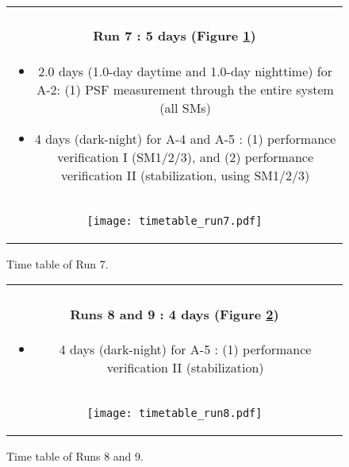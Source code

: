 \begin{figure}[!ht]
\begin{center}
\begin{tabular}{c}
\begin{minipage}{0.95\hsize}
\paragraph{Run 7 : 5 days  (Figure \ref{fig:run7})}
	\begin{itemize}
	\item 2.0 days (1.0-day daytime and 1.0-day nighttime) for A-2: 
	(1) PSF measurement through the entire system (all SMs)
	\item 4 days (dark-night) for A-4 and A-5 : 
	(1) performance verification I (SM1/2/3),  and
	(2) performance verification II (stabilization, using SM1/2/3)
	\end{itemize}
\end{minipage} \\
\begin{minipage}{0.8\hsize}
	\begin{center}
	\vspace*{5mm}
	\texttt{[image: timetable\_run7.pdf]}
	\end{center}
	\vspace*{-5mm}
	\caption{Time table of Run 7.}
	\label{fig:run7}
\end{minipage}
\end{tabular}
\end{center}
\end{figure}

\begin{figure}[!ht]
\begin{center}
\begin{tabular}{c}
\begin{minipage}{0.95\hsize}
\paragraph{Runs 8 and 9 : 4 days  (Figure \ref{fig:run8})}
	\begin{itemize}
	\item 4 days (dark-night) for A-5 :
	(1) performance verification II (stabilization)
	\end{itemize}
\end{minipage} \\
\begin{minipage}{0.8\hsize}
	\begin{center}
	\vspace*{5mm}
	\texttt{[image: timetable\_run8.pdf]}
	\end{center}
	\vspace*{-5mm}
	\caption{Time table of Runs 8 and 9.}
	\label{fig:run8}
\end{minipage}
\end{tabular}
\end{center}
\end{figure}


